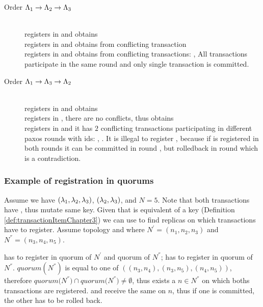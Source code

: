  \begin{description}
 \item[Order $\text{$\Lambda_{1}$} \rightarrow \text{$\Lambda_{2}$} \rightarrow \text{$\Lambda_{3}$}$] \hfill \\
 	 registers in \txIndex and obtains  \\
 	 registers in \txIndex and obtains  from conflicting transaction  \\
 	 registers in \txIndex and obtains  from conflicting transactions: ,  All transactions participate in the same \paxos round and only single transaction is committed. 
 \item[Order $\text{$\Lambda_{1}$} \rightarrow \text{$\Lambda_{3}$} \rightarrow \text{$\Lambda_{2}$}$] \hfill \\
 	 registers in \txIndex and obtains  \\
 	 registers in \txIndex, there are no conflicts, thus obtains \\
 	 registers in \txIndex and it has $2$ conflicting transactions participating in different paxos rounds with ids: , . It is illegal to register , because if  is registered in both rounds it can be committed in round , but rolledback in round  which is a contradiction.

 \end{description}

\subsubsection{Example of registration in quorums}
Assume we have 
$(\text{$\lambda_{1}$},\text{$\lambda_{2}$}, \text{$\lambda_{3}$})$,
$(\text{$\lambda_{2}$},\text{$\lambda_{3}$})$,  and $N=5$. Note that both transactions have , thus mutate same key. Given that \txItem is equivalent of a key (Definition \ref{def:transactionItemChapter3}) we can use \topology to find replicas on which transactions have to register. Assume topology  and  where $N^'=(n_1, n_2, n_3)$ and $N^{''}=(n_3,n_4,n_5)$.

 has to register in quorum of $N^'$ and quorum of $N^{''}$;  has to register in quorum of $N^{''}$.
$quorum(N^{''})$ is equal to one of $((n_3,n_4),(n_3,n_5),(n_4,n_5))$, therefore $\mathit{quorum(N^{''}}) \cap \mathit{quorum(N^{''}}) \neq \emptyset$, thus exists a $n\in N^{''}$ on which boths transactions are registered.
 and  receive the same \paxosRoundId on $n$, thus if one is committed, the other has to be rolled back.

